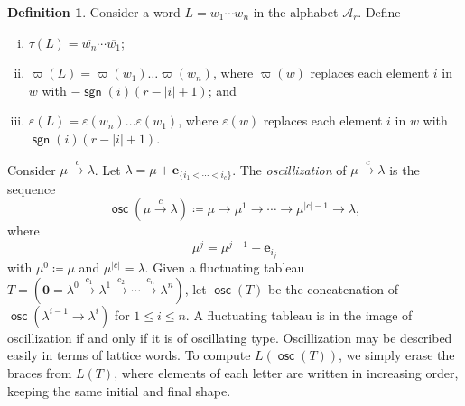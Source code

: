 \documentclass{amsart}
\theoremstyle{definition}
\newtheorem{definition}[theorem]{Definition}
\theoremstyle{remark}
\numberwithin{equation}{section}
\DeclareMathOperator{\osc}{\mathsf{osc}}
\DeclareMathOperator{\sgn}{\mathsf{sgn}}
\newcommand{\too}[1]{\stackrel{#1}{\to}}
\begin{document}
\begin{definition}\label{def:varpietc}
  Consider a word $L = w_1 \cdots w_n$ in the alphabet $\mathcal{A}_r$. Define
  \begin{enumerate}[(i)]
    \item $\tau(L) = \overline{w_n} \cdots \overline{w_1}$;
  \item $\varpi(L) = \varpi(w_1) \dots \varpi(w_n)$, where $\varpi(w)$ replaces each element $i$ in $w$ with $-\sgn(i)(r-|i|+1)$; and
    \item $\varepsilon(L) = \varepsilon(w_n) \dots \varepsilon(w_1)$, where $\varepsilon(w)$ replaces each element $i$ in $w$ with $\sgn(i)(r-|i|+1)$.
  \end{enumerate}
\end{definition}

    Consider $\mu \too{c} \lambda$. Let $\lambda = \mu + \mathbf{e}_{\{i_1 < \cdots < i_c\}}$. 
The \emph{oscillization} of $\mu \too{c} \lambda$ is the sequence
  \[ \osc(\mu \too{c} \lambda) \coloneqq \mu \to \mu^1 \to \cdots \to \mu^{|c| - 1} \to \lambda, \]
where
\[
\mu^j =  \mu^{j-1} + \mathbf{e}_{i_j} 
\]
with $\mu^0 \coloneqq \mu$ and $\mu^{|c|} = \lambda$.
Given a fluctuating tableau $T = (\mathbf{0}=\lambda^0 \too{c_1} \lambda^1 \too{c_2} \cdots \too{c_n} \lambda^n)$, let $\osc(T)$ be the concatenation of $\osc(\lambda^{i-1} \to \lambda^i)$ for $1 \leq i \leq n$. A fluctuating tableau is in the image of oscillization if and only if it is of oscillating type.
Oscillization may be described easily in terms of lattice words. To compute $L(\osc(T))$, we simply erase the braces from $L(T)$, where elements of each letter are written in increasing order, keeping the same initial and final shape. 
\end{document}
